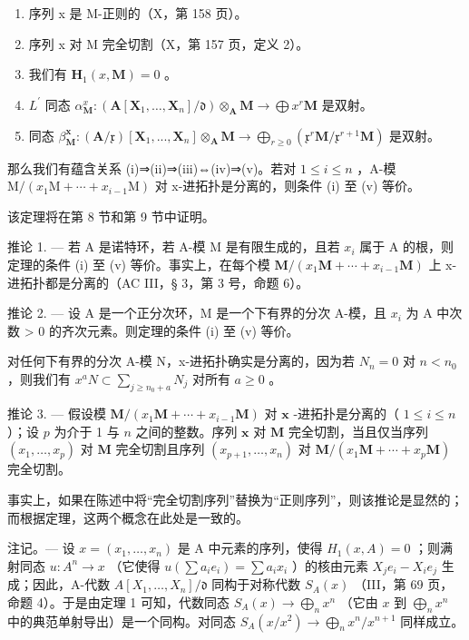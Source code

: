 \begin{enumerate}
\def\labelenumi{(\roman{enumi})}
\item
  序列 x 是 M-正则的（X，第 158 页）。
\item
  序列 x 对 M 完全切割（X，第 157 页，定义 2）。
\item
  我们有 \(\mathbf{H}_1(x, \mathbf{M}) = 0\) 。
\item
  \(L^{\prime}\) 同态 \(\alpha_{\mathbf{M}}^{x}:(\mathbf{A}[\mathbf{X}_{1},\dots,\mathbf{X}_{n}]/\mathfrak{d})\otimes_{\mathbf{A}}\mathbf{M}\to\bigoplus x^{r}\mathbf{M}\) 是双射。
\item
  同态 \(\beta_{\mathbf{M}}^{\mathbf{x}}:(\mathbf{A}/\mathfrak{x})[\mathbf{X}_{1},..., \mathbf{X}_{n}]\otimes_{\mathbf{A}}\mathbf{M}\to\bigoplus_{r\geqslant0}(\mathfrak{x}^{r}\mathbf{M}/\mathfrak{x}^{r+1}\mathbf{M})\) 是双射。
\end{enumerate}

那么我们有蕴含关系 (i)⇒(ii)⇒(iii)⇔(iv)⇒(v)。若对 \(1 \leqslant i \leqslant n\) ，A-模 \(\mathrm{M}/(x_{1}\mathrm{M} + \cdots + x_{i-1}\mathrm{M})\) 对 x-进拓扑是分离的，则条件 (i) 至 (v) 等价。

该定理将在第 8 节和第 9 节中证明。

推论 1. --- 若 A 是诺特环，若 A-模 M 是有限生成的，且若 \(x_{i}\) 属于 A 的根，则定理的条件 (i) 至 (v) 等价。事实上，在每个模 \(\mathbf{M}/(x_{1} \mathbf{M} + \cdots + x_{i-1} \mathbf{M})\) 上 x-进拓扑都是分离的（AC III，§ 3，第 3 号，命题 6）。

推论 2. --- 设 A 是一个正分次环，M 是一个下有界的分次 A-模，且 \(x_i\) 为 A 中次数 \textgreater{} 0 的齐次元素。则定理的条件 (i) 至 (v) 等价。

对任何下有界的分次 A-模 N，x-进拓扑确实是分离的，因为若 \(N_{n}=0\) 对 \(n<n_{0}\) ，则我们有 \(x^{a}N\subset\sum_{j\geqslant n_{0}+a}N_{j}\) 对所有 \(a\geqslant0\) 。

推论 3. --- 假设模 \(\mathbf{M}/(x_1\mathbf{M} + \cdots + x_{i-1}\mathbf{M})\) 对 \(\mathbf{x}\) -进拓扑是分离的（ \(1 \leqslant i \leqslant n\) ）；设 \(p\) 为介于 1 与 \(n\) 之间的整数。序列 \(\mathbf{x}\) 对 \(\mathbf{M}\) 完全切割，当且仅当序列 \((x_1, \ldots, x_p)\) 对 \(\mathbf{M}\) 完全切割且序列 \((x_{p+1}, \ldots, x_n)\) 对 \(\mathbf{M}/(x_1\mathbf{M} + \cdots + x_p\mathbf{M})\) 完全切割。

事实上，如果在陈述中将“完全切割序列”替换为“正则序列”，则该推论是显然的；而根据定理，这两个概念在此处是一致的。

注记。--- 设 \(x = (x_1, \ldots, x_n)\) 是 A 中元素的序列，使得 \(H_1(x, A) = 0\) ；则满射同态 \(u: A^n \to x\) （它使得 \(u(\sum a_i e_i) = \sum a_i x_i\) ）的核由元素 \(X_j e_i - X_i e_j\) 生成；因此，A-代数 \(A[X_1, \ldots, X_n] / \mathfrak{d}\) 同构于对称代数 \(S_A(x)\) （III，第 69 页，命题 4）。于是由定理 1 可知，代数同态 \(S_A(x) \to \bigoplus_n x^n\) （它由 \(x\) 到 \(\bigoplus_n x^n\) 中的典范单射导出）是一个同构。对同态 \(S_A(x / x^2) \to \bigoplus_n x^n / x^{n+1}\) 同样成立。

